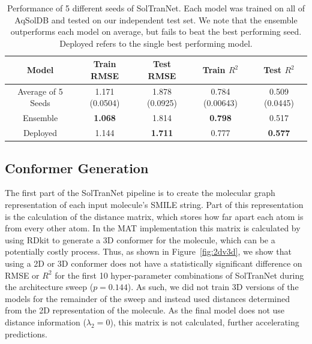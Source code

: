 \documentclass[journal=jmcmar,manuscript=article]{achemso}
\begin{document}
\begin{table}
    \begin{tabular}{|c|c|c|c|c|}
        \hline
        Model & Train RMSE & Test RMSE & Train $R^2$ & Test $R^2$ \\
        \hline
        Average of 5 Seeds & 1.171 (0.0504) & 1.878 (0.0925)  & 0.784 (0.00643) & 0.509 (0.0445)\\
        Ensemble & \textbf{1.068} & 1.814 & \textbf{0.798} & 0.517\\
        Deployed & 1.144 & \textbf{1.711} & 0.777 & \textbf{0.577}\\
        \hline
    \end{tabular}
    \caption{Performance of 5 different seeds of SolTranNet. Each model was trained on all of AqSolDB and tested on our independent test set. We note that the ensemble outperforms each model on average, but fails to beat the best performing seed. Deployed refers to the single best performing model.}
    \label{tab:deployed}
\end{table}

\subsection{Conformer Generation}

The first part of the SolTranNet pipeline is to create the molecular graph representation of each input molecule's SMILE string.
Part of this representation is the calculation of the distance matrix, which stores how far apart each atom is from every other atom.
In the MAT implementation this matrix is calculated by using RDkit to generate a 3D conformer for the molecule, which can be a potentially costly process.
Thus, as shown in Figure~\ref{fig:2dv3d}, we show that using a 2D or 3D conformer does not have a statistically significant difference on RMSE or $R^2$ for the first 10 hyper-parameter combinations of SolTranNet during the architecture sweep ($p=0.144$).
As such, we did not train 3D versions of the models for the remainder of the sweep and instead used distances determined from the 2D representation of the molecule. 
As the final model does not use distance information ($\lambda_2 = 0$), this matrix is not calculated, further accelerating predictions.
\end{document}
